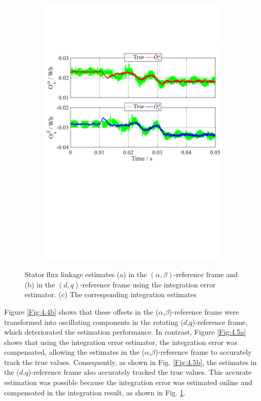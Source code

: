 \begin{figure}[H]
\begin{subfigure}[b]{0.80\textwidth}
        \includegraphics[scale=0.55]{chapters/Fig4.5c.pdf}
        \caption{}
        \label{Fig:4.5c}
    \end{subfigure}
    \caption{Stator flux linkage estimates (a) in the $(\alpha,\beta)$-reference frame and (b) in the $(d,q)$-reference frame using the integration error estimator. (c) The corresponding integration estimates}
    \label{Fig:4.5}
\end{figure}Figure \ref{Fig:4.4b} shows that these offsets in the ($\alpha$,$\beta$)-reference frame were transformed into oscillating components in the rotating ($d$,$q$)-reference frame, which deteriorated the estimation performance. In contrast, Figure \ref{Fig:4.5a} shows that using the integration error estimator, the integration error was compensated, allowing the estimates in the ($\alpha$,$\beta$)-reference frame to accurately track the true values. Consequently, as shown in Fig. \ref{Fig:4.5b}, the estimates in the ($d$,$q$)-reference frame also accurately tracked the true values. This accurate estimation was possible because the integration error was estimated online and compensated in the integration result, as shown in Fig. \ref{Fig:4.5c}.

